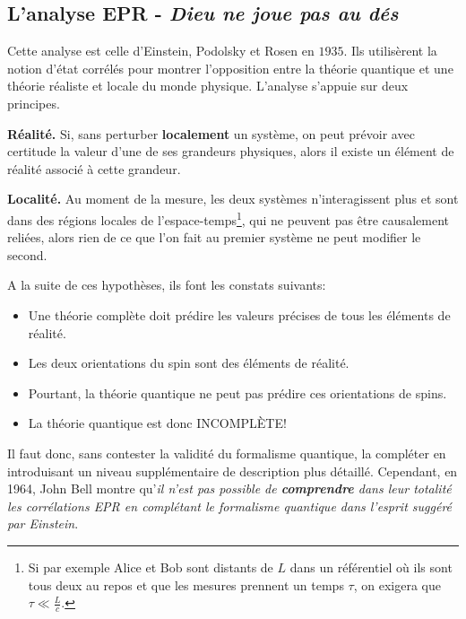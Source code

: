 \subsection{L'analyse EPR - \emph{Dieu ne joue pas au dés}}

Cette analyse est celle d'Einstein, Podolsky et Rosen en $1935$. Ils utilisèrent
la notion d'état corrélés pour montrer l'opposition entre la théorie quantique
et une théorie réaliste et locale du monde physique. L'analyse s'appuie sur deux
principes.

\begin{principe}
 \textbf{Réalité.} Si, sans perturber \textbf{localement} un système, on peut
prévoir avec certitude la valeur d'une de ses grandeurs physiques, alors il
existe un élément de réalité associé à cette grandeur.
\end{principe}

\begin{principe}
\textbf{Localité.} Au moment de la mesure, les deux systèmes n'interagissent
plus et sont dans des régions locales de l'espace-temps\footnote{Si par exemple
Alice et Bob sont distants de $L$ dans un référentiel où ils sont tous deux au
repos et que les mesures prennent un temps $\tau$, on exigera que
$\tau\ll\frac{L}{c}$.}, qui ne peuvent pas être causalement reliées, alors rien
de ce que l'on fait au premier système ne peut modifier le second.
\end{principe}

A la suite de ces hypothèses, ils font les constats suivants:

\begin{itemize}
\item Une théorie complète doit prédire les valeurs précises de tous les
éléments de réalité.

\item Les deux orientations du spin sont des éléments de réalité.

\item Pourtant, la théorie quantique ne peut pas prédire ces orientations de
spins.

\item La théorie quantique est donc INCOMPLÈTE!
\end{itemize}

Il faut donc, sans contester la validité du formalisme quantique, la compléter
en introduisant un niveau supplémentaire de description plus détaillé.
Cependant, en 1964, John Bell montre qu'\emph{il n'est pas possible de
\textbf{comprendre} dans leur totalité les corrélations EPR en complétant le
formalisme quantique dans l'esprit suggéré par Einstein}.


